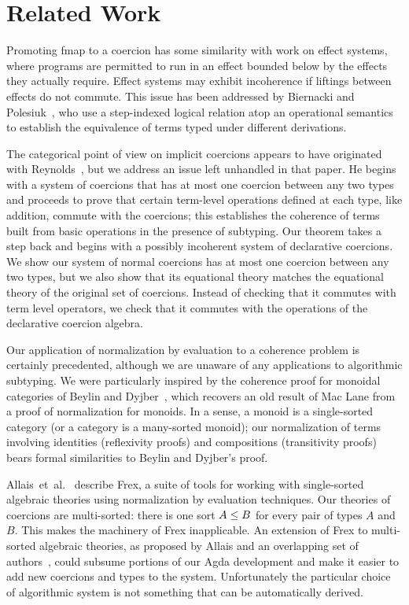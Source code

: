 \documentclass[acmsmall,screen]{acmart}
\begin{document}
\section{Related Work}
Promoting fmap to a coercion has some similarity with work on effect systems,
where programs are permitted to run in an effect bounded below by the effects
they actually require. Effect systems may exhibit incoherence if liftings
between effects do not commute. This issue has been addressed by Biernacki and
Polesiuk~\cite{DBLP:journals/lmcs/BiernackiP18}, who use a step-indexed logical
relation atop an operational semantics to establish the equivalence of terms
typed under different derivations.

The categorical point of view on implicit coercions appears to have originated
with Reynolds~\cite{reynolds80}, but we address an issue left unhandled in that
paper. He begins with a system of coercions that has at most one coercion
between any two types and proceeds to prove that certain term-level operations
defined at each type, like addition, commute with the coercions; this
establishes the coherence of terms built from basic operations in the presence
of subtyping. Our theorem takes a step back and begins with a possibly
incoherent system of declarative coercions. We show our system of normal
coercions has at most one coercion between any two types, but we also show that
its equational theory matches the equational theory of the original set of
coercions. Instead of checking that it commutes with term level operators, we
check that it commutes with the operations of the declarative coercion algebra.

Our application of normalization by evaluation to a coherence problem is
certainly precedented, although we are unaware of any applications to
algorithmic subtyping. We were particularly inspired by the coherence proof for
monoidal categories of Beylin and Dyjber~\cite{beylin95}, which recovers an old
result of Mac Lane from a proof of normalization for monoids. In a sense, a
monoid is a single-sorted category (or a category is a many-sorted monoid); our
normalization of terms involving identities (reflexivity proofs) and
compositions (transitivity proofs) bears formal similarities to Beylin and
Dyjber's proof.

Allais~et~al.~\cite{allais2025frex} describe Frex, a suite of tools for working
with single-sorted algebraic theories using normalization by evaluation
techniques.  Our theories of coercions are multi-sorted: there is one sort \(A
\leq B\) for every pair of types \(A\) and \(B\). This makes the machinery of
Frex inapplicable. An extension of Frex to multi-sorted algebraic theories, as
proposed by Allais and an overlapping set of authors~\cite{allais2023}, could
subsume portions of our Agda development and make it easier to add new coercions
and types to the system. Unfortunately the particular choice of algorithmic
system is not something that can be automatically derived.
\end{document}
